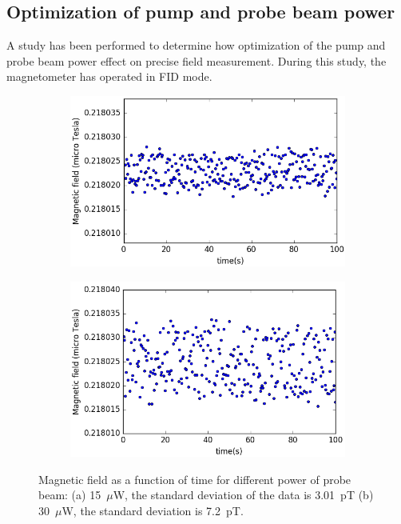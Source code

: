 \subsection{Optimization of pump and probe beam power} 
A study has been performed to determine how optimization of the pump
and probe beam power effect on precise field measurement.  During this
study, the magnetometer has operated in FID mode.
\begin{figure}
  \centering
  \begin{subfigure}[b]{0.7\textwidth}
    \centering
    \includegraphics[width=\textwidth]{figures/beam_power_less}
    \caption{}
    \label{fig:power less}
  \end{subfigure}
  \begin{subfigure}[b]{0.7\textwidth}
    \centering
    \includegraphics[width=\textwidth]{figures/beam_power_double}
    \caption{}
    \label{fig:power double}
  \end{subfigure}
  \caption{ Magnetic field as a function of time for different power
    of probe beam: (a) 15~$\mu$W, the standard deviation of the data
    is 3.01~pT (b) 30~$\mu$W, the standard deviation is
    7.2~pT.\label{fig:different probe power}}
\end{figure}
 

